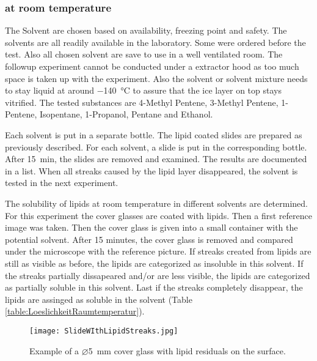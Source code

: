 \subsubsection{at room temperature}

The Solvent are chosen based on availability, freezing point and safety. The solvents are all readily available in the laboratory. Some were ordered before the test. Also all chosen solvent are save to use in a well ventilated room. The followup experiment cannot be conducted under a extractor hood as too much space is taken up with the experiment. Also the solvent or solvent mixture needs to stay liquid at around \SI{-140}{\degreeCelsius} to assure that the ice layer on top stays vitrified. The tested substances are 4-Methyl Pentene, 3-Methyl Pentene, 1-Pentene, Isopentane, 1-Propanol, Pentane and Ethanol. 

Each solvent is put in a separate bottle. The lipid coated slides are prepared as previously described. For each solvent, a slide is put in the corresponding bottle. After \SI{15}{\minute}, the slides are removed and examined. The results are documented in a list. When all streaks caused by the lipid layer disappeared, the solvent is tested in the next experiment.

The solubility of lipids at room temperature in different solvents are determined. For this experiment the cover glasses are coated with lipids. Then a first reference image was taken. Then the cover glass is given into a small container with the potential solvent. After 15 minutes, the cover glass is removed and compared under the microscope with the reference picture. If streaks created from lipids are still as visible as before, the lipids are categorized as insoluble in this solvent. If the streaks partially dissapeared and/or are less visible, the lipids are categorized as partially soluble in this solvent. Last if the streaks completely disappear, the lipids are assinged as soluble in the solvent (Table \ref{table:LoeslichkeitRaumtemperatur}).

\begin{figure}[hbt!]
	\centering
	\texttt{[image: SlideWIthLipidStreaks.jpg]}
	\caption{Example of a $\varnothing$\SI{5}{\milli\meter} cover glass with lipid residuals on the surface.}
\end{figure}


